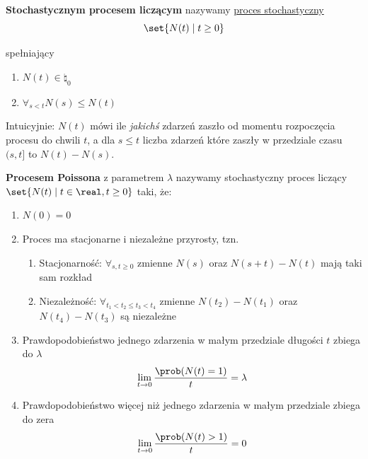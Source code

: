 \begin{definition}
	\textbf{Stochastycznym procesem liczącym} nazywamy \hyperref[stochastic-process-definition]{proces stochastyczny}
	\[\set{N(t) \mid t \geq 0}\]

	spełniający
	\begin{enumerate}
		\item \(N(t) \in \natural_0\)
		\item \(\forall_{s < t} N(s) \leq N(t)\)
	\end{enumerate}
\end{definition}

Intuicyjnie: \(N(t)\) mówi ile \textit{jakichś} zdarzeń zaszło od momentu rozpoczęcia procesu do chwili \(t\), a dla \(s \leq t\) liczba zdarzeń które zaszły w przedziale czasu \((s, t]\) to \(N(t) - N(s)\).

\begin{definition}
	\label{poisson-process-definition}
	\textbf{Procesem Poissona} z parametrem \( \lambda \) nazywamy stochastyczny proces liczący \( \set{N(t) \mid t \in \real, t \geq 0} \) taki, że:

	\begin{enumerate}
		\item \( N(0) = 0 \)

		\item Proces ma stacjonarne i niezależne przyrosty, tzn.
		      \begin{enumerate}[label=\arabic{enumi}\alph*.]
			      \item Stacjonarność: \(\forall_{s, t \geq 0}\) zmienne \(N(s)\) oraz \(N(s+t) - N(t)\) mają taki sam rozkład
			      \item Niezależność: \(\forall_{t_1 < t_2 \leq t_3 < t_4}\) zmienne \( N(t_2) - N(t_1) \) oraz \( N(t_4) - N(t_3) \) są niezależne
		      \end{enumerate}

		\item Prawdopodobieństwo jednego zdarzenia w małym przedziale długości \( t \) zbiega do \( \lambda  \) \\
		      \[ \lim_{t \rightarrow 0} \frac{\prob(N(t) = 1)}{t} = \lambda \]

		\item Prawdopodobieństwo więcej niż jednego zdarzenia w małym przedziale zbiega do zera \\
		      \[ \lim_{t \rightarrow 0} \frac{\prob(N(t) > 1)}{t} = 0 \]
	\end{enumerate}
\end{definition}

